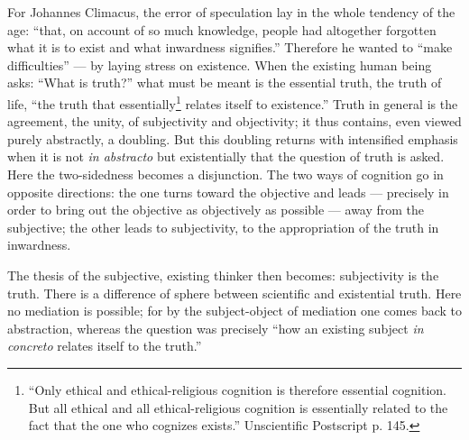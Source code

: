\documentclass[12pt,a4paper]{book}
\begin{document}
For Johannes Climacus, the error of speculation lay in the whole tendency of the age: ``that, on account of so much knowledge, people had altogether forgotten what it is to exist and what inwardness signifies.'' Therefore he wanted to ``make difficulties'' --- by laying stress on existence. When the existing human being asks: ``What is truth?'' what must be meant is the essential truth, the truth of life, ``the truth that essentially\footnote{%
``Only ethical and ethical-religious cognition is therefore essential cognition. But all ethical and all ethical-religious cognition is essentially related to the fact that the one who cognizes exists.'' Unscientific Postscript p. 145.} relates itself to existence.'' Truth in general is the agreement, the unity, of subjectivity and objectivity; it thus contains, even viewed purely abstractly, a doubling. But this doubling returns with intensified emphasis when it is not \textit{in abstracto} but existentially that the question of truth is asked. Here the two-sidedness becomes a disjunction. The two ways of cognition go in opposite directions: the one turns toward the objective and leads --- precisely in order to bring out the objective as objectively as possible --- away from the subjective; the other leads to subjectivity, to the appropriation of the truth in inwardness.

The thesis of the subjective, existing thinker then becomes: subjectivity is the truth. There is a difference of sphere between scientific and existential truth. Here no mediation is possible; for by the subject-object of mediation one comes back to abstraction, whereas the question was precisely ``how an existing subject \textit{in concreto} relates itself to the truth.''
\end{document}
